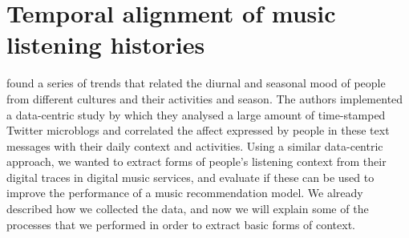 

















\section{Temporal alignment of music listening histories}\label{sec:5-temporal-alignment-of-music-listening-histories}
\textcite{golder11diurnal} found a series of trends that related the diurnal and seasonal mood of people from different cultures and their activities and season. The authors implemented a data-centric study by which they analysed a large amount of time-stamped Twitter microblogs and correlated the affect expressed by people in these text messages with their daily context and activities. 
Using a similar data-centric approach, we wanted to extract forms of people's listening context from their digital traces in digital music services, and evaluate if these can be used to improve the performance of a music recommendation model. We already described how we collected the data, and now we will explain some of the processes that we performed in order to extract basic forms of context.

